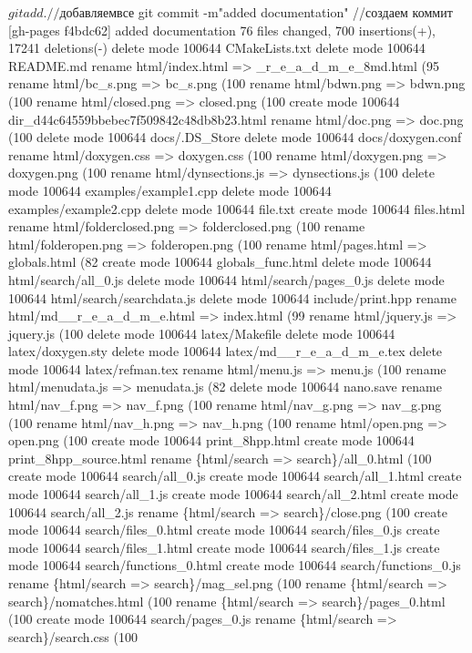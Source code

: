 \begin{DoxyCode}
$ git add . //добавляем все
$ git commit -m"added documentation" //создаем коммит
[gh-pages f4bdc62] added documentation
76 files changed, 700 insertions(+), 17241 deletions(-)
delete mode 100644 CMakeLists.txt
delete mode 100644 README.md
rename html/index.html => \_r\_e\_a\_d\_m\_e\_8md.html (95%
rename html/bc\_s.png => bc\_s.png (100%
rename html/bdwn.png => bdwn.png (100%
rename html/closed.png => closed.png (100%
create mode 100644 dir\_d44c64559bbebec7f509842c48db8b23.html
rename html/doc.png => doc.png (100%
delete mode 100644 docs/.DS\_Store
delete mode 100644 docs/doxygen.conf
rename html/doxygen.css => doxygen.css (100%
rename html/doxygen.png => doxygen.png (100%
rename html/dynsections.js => dynsections.js (100%
delete mode 100644 examples/example1.cpp
delete mode 100644 examples/example2.cpp
delete mode 100644 file.txt
create mode 100644 files.html
rename html/folderclosed.png => folderclosed.png (100%
rename html/folderopen.png => folderopen.png (100%
rename html/pages.html => globals.html (82%
create mode 100644 globals\_func.html
delete mode 100644 html/search/all\_0.js
delete mode 100644 html/search/pages\_0.js
delete mode 100644 html/search/searchdata.js
delete mode 100644 include/print.hpp
rename html/md\_\_r\_e\_a\_d\_m\_e.html => index.html (99%
rename html/jquery.js => jquery.js (100%
delete mode 100644 latex/Makefile
delete mode 100644 latex/doxygen.sty
delete mode 100644 latex/md\_\_r\_e\_a\_d\_m\_e.tex
delete mode 100644 latex/refman.tex
rename html/menu.js => menu.js (100%
rename html/menudata.js => menudata.js (82%
delete mode 100644 nano.save
rename html/nav\_f.png => nav\_f.png (100%
rename html/nav\_g.png => nav\_g.png (100%
rename html/nav\_h.png => nav\_h.png (100%
rename html/open.png => open.png (100%
create mode 100644 print\_8hpp.html
create mode 100644 print\_8hpp\_source.html
rename \{html/search => search\}/all\_0.html (100%
create mode 100644 search/all\_0.js
create mode 100644 search/all\_1.html
create mode 100644 search/all\_1.js
create mode 100644 search/all\_2.html
create mode 100644 search/all\_2.js
rename \{html/search => search\}/close.png (100%
create mode 100644 search/files\_0.html
create mode 100644 search/files\_0.js
create mode 100644 search/files\_1.html
create mode 100644 search/files\_1.js
create mode 100644 search/functions\_0.html
create mode 100644 search/functions\_0.js
rename \{html/search => search\}/mag\_sel.png (100%
rename \{html/search => search\}/nomatches.html (100%
rename \{html/search => search\}/pages\_0.html (100%
create mode 100644 search/pages\_0.js
rename \{html/search => search\}/search.css (100%

\end{DoxyCode}
